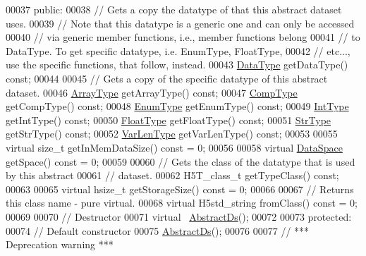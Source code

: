 \begin{DoxyCode}
00037    \textcolor{keyword}{public}:
00038         \textcolor{comment}{// Gets a copy the datatype of that this abstract dataset uses.}
00039         \textcolor{comment}{// Note that this datatype is a generic one and can only be accessed}
00040         \textcolor{comment}{// via generic member functions, i.e., member functions belong}
00041         \textcolor{comment}{// to DataType.  To get specific datatype, i.e. EnumType, FloatType,}
00042         \textcolor{comment}{// etc..., use the specific functions, that follow, instead.}
00043         \hyperlink{class_h5_1_1_data_type}{DataType} getDataType() \textcolor{keyword}{const};
00044 
00045         \textcolor{comment}{// Gets a copy of the specific datatype of this abstract dataset.}
00046         \hyperlink{class_h5_1_1_array_type}{ArrayType} getArrayType() \textcolor{keyword}{const};
00047         \hyperlink{class_h5_1_1_comp_type}{CompType} getCompType() \textcolor{keyword}{const};
00048         \hyperlink{class_h5_1_1_enum_type}{EnumType} getEnumType() \textcolor{keyword}{const};
00049         \hyperlink{class_h5_1_1_int_type}{IntType} getIntType() \textcolor{keyword}{const};
00050         \hyperlink{class_h5_1_1_float_type}{FloatType} getFloatType() \textcolor{keyword}{const};
00051         \hyperlink{class_h5_1_1_str_type}{StrType} getStrType() \textcolor{keyword}{const};
00052         \hyperlink{class_h5_1_1_var_len_type}{VarLenType} getVarLenType() \textcolor{keyword}{const};
00053 
00055         \textcolor{keyword}{virtual} \textcolor{keywordtype}{size\_t} getInMemDataSize() \textcolor{keyword}{const} = 0;
00056 
00058         \textcolor{keyword}{virtual} \hyperlink{class_h5_1_1_data_space}{DataSpace} getSpace() \textcolor{keyword}{const} = 0;
00059 
00060         \textcolor{comment}{// Gets the class of the datatype that is used by this abstract}
00061         \textcolor{comment}{// dataset.}
00062         H5T\_class\_t getTypeClass() \textcolor{keyword}{const};
00063 
00065         \textcolor{keyword}{virtual} hsize\_t getStorageSize() \textcolor{keyword}{const} = 0;
00066 
00067         \textcolor{comment}{// Returns this class name - pure virtual.}
00068         \textcolor{keyword}{virtual} H5std\_string fromClass() \textcolor{keyword}{const} = 0;
00069 
00070         \textcolor{comment}{// Destructor}
00071         \textcolor{keyword}{virtual} ~\hyperlink{class_h5_1_1_abstract_ds}{AbstractDs}();
00072 
00073    \textcolor{keyword}{protected}:
00074         \textcolor{comment}{// Default constructor}
00075         \hyperlink{class_h5_1_1_abstract_ds}{AbstractDs}();
00076 
00077         \textcolor{comment}{// *** Deprecation warning ***}

\end{DoxyCode}
